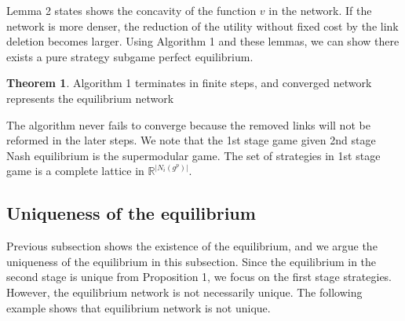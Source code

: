 \documentclass[12pt]{article}
\theoremstyle{definition}
\newtheorem{theorem}{Theorem}
\begin{document}
Lemma 2 states shows the concavity of the function $v$ in the network.
If the network is more denser, the reduction of the utility without fixed cost by the link deletion becomes larger.
Using Algorithm 1 and these lemmas, we can show there exists a pure strategy subgame perfect equilibrium.

\begin{theorem}
Algorithm 1 terminates in finite steps, and converged network represents the equilibrium network
\end{theorem}

The algorithm never fails to converge because the removed links will not be reformed in the later steps.
We note that the 1st stage game given 2nd stage Nash equilibrium is the supermodular game.
The set of strategies in 1st stage game is a complete lattice in $\mathbb{R}^{|N_i(g^p)|}$.


\subsection{Uniqueness of the equilibrium}

Previous subsection shows the existence of the equilibrium, and we argue the uniqueness of the equilibrium in this subsection.
Since the equilibrium in the second stage is unique from Proposition 1, we focus on the first stage strategies.
However, the equilibrium network is not necessarily unique.
The following example shows that equilibrium network is not unique.
\end{document}

